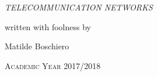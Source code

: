 \documentclass[a4paper, 12pt, twoside, openright, fleqn]{book}
\theoremstyle{theoremdd}
\theoremstyle{remark}
\begin{document}
\frontmatter

\begin{titlepage} %
\begin{center}

\hspace{0.5cm}

\emph{\Large{TELECOMMUNICATION NETWORKS}} \\
\vspace{1cm}
\vspace{0.5cm}
{written with foolness by\par}
{\Large Matilde Boschiero\par}
\end{center}

\vfill
\begin{center}
\noindent\makebox[\linewidth]{\rule{\textwidth}{0.4pt}}
\textsc{Academic Year 2017/2018}
\end{center}
\end{titlepage}

\begingroup %
  \makeatletter
  \let\ps@plain\ps@empty
  \makeatother
  \tableofcontents
  \clearpage
\endgroup
\mainmatter

% 
% 
% 
% 
% 
\end{document}
